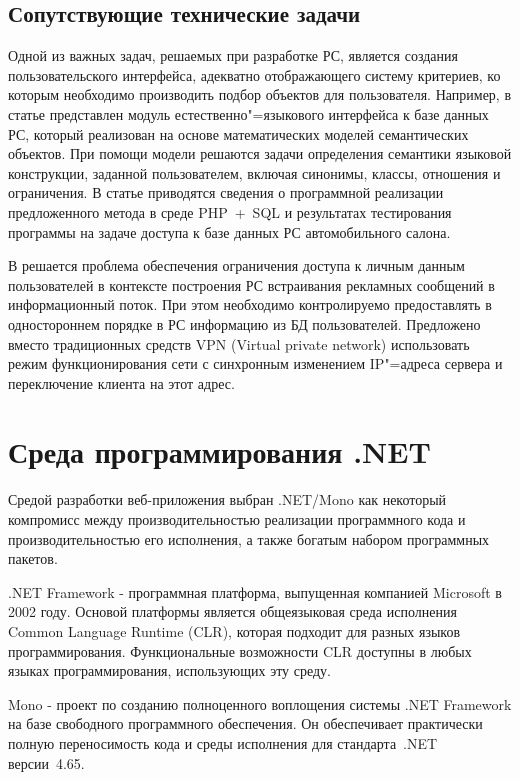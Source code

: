 \documentclass[a4paper,14pt,openany,final]{extreport} %
\begin{document}
\subsection{Сопутствующие технические задачи}
\label{sec:co-tasks}

Одной из важных задач, решаемых при разработке РС, является создания пользовательского интерфейса, адекватно отображающего систему критериев, ко которым необходимо производить подбор объектов для пользователя. Например, в статье \cite{b14} представлен модуль естественно"=языкового интерфейса к базе данных РС, который реализован на основе математических моделей семантических объектов. При помощи модели решаются задачи определения семантики языковой конструкции, заданной пользователем, включая синонимы, классы, отношения и ограничения. В статье приводятся сведения о программной реализации предложенного метода в среде PHP~+~SQL и результатах тестирования программы на задаче доступа к базе данных РС автомобильного салона.

В \cite{b15} решается проблема обеспечения ограничения доступа к личным данным пользователей в контексте построения РС встраивания рекламных сообщений в информационный поток. При этом необходимо контролируемо предоставлять в одностороннем порядке в РС информацию из БД пользователей. Предложено вместо традиционных средств VPN (\foreignlanguage{english}{Virtual private network}) использовать режим функционирования сети с синхронным изменением IP"=адреса сервера и переключение клиента на этот адрес.

\section{Среда программирования .NET}
Средой разработки веб-приложения выбран .NET/Mono как некоторый компромисс между производительностью реализации программного кода и производительностью его исполнения, а также богатым набором программных пакетов.

.NET Framework - программная платформа, выпущенная компанией Microsoft в 2002 году. Основой платформы является общеязыковая среда исполнения Common Language Runtime (CLR), которая подходит для разных языков программирования. Функциональные возможности CLR доступны в любых языках программирования, использующих эту среду.

Mono - проект по созданию полноценного воплощения системы .NET Framework на базе свободного программного обеспечения. Он обеспечивает практически полную переносимость кода и среды исполнения для стандарта~.NET версии~4.65.
\end{document}
